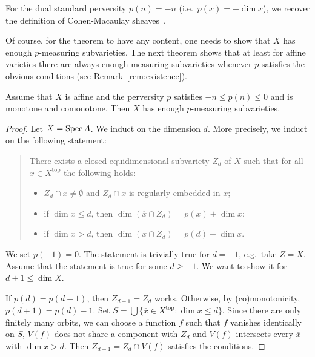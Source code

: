 \documentclass[english,biblatex-alpha,bw]{short-notes}
\begin{document}
\begin{Ex}
    For the dual standard perversity $p(n) = -n$ (i.e.\ $p(x) = -\dim x$), we recover the definition of Cohen-Macaulay sheaves~\cite[Section~IV.3]{Hartshorne:1966:ResiduesAndDuality}.
\end{Ex}

Of course, for the theorem to have any content, one needs to show that $X$ has enough $p$-measuring subvarieties.
The next theorem shows that at least for affine varieties there are always enough measuring subvarieties whenever $p$ satisfies the obvious conditions (see Remark~\ref{rem:existence}).

\begin{Thm}\label{thm:existance}%
    Assume that $X$ is affine and the perversity $p$ satisfies $-n \le p(n) \le 0$ and is monotone and comonotone.
    Then $X$ has enough $p$-measuring subvarieties.
\end{Thm}

\begin{proof}
    Let $X = \operatorname{Spec} A$.
    We induct on the dimension $d$.
    More precisely, we induct on the following statement:
    \begin{quote}
        There exists a closed equidimensional subvariety $Z_d$ of $X$ such that for all $x \in  X^{\mathrm{top}}$ the following holds:
        \begin{itemize}
            \item $Z_d \cap \overline x \ne \emptyset$ and $Z_d \cap \overline x$ is regularly embedded in $\overline x$;
            \item if $\dim x \le d$, then $\dim(\overline x \cap  Z_d) = p(x) + \dim x$;
            \item if $\dim x > d$, then $\dim(\overline x \cap  Z_d) = p(d) + \dim x$.
        \end{itemize}
    \end{quote}
    We set $p(-1) = 0$.
    The statement is trivially true for $d = -1$, e.g.~take $Z = X$.
    Assume that the statement is true for some $d \ge -1$.
    We want to show it for $d+1 \le \dim X$.

    If $p(d) = p(d+1)$, then $Z_{d+1} = Z_{d}$ works.
    Otherwise, by (co)monotonicity, $p(d+1) = p(d) - 1$.
    Set $S = \bigcup \{ \overline x \in  X^{\mathrm{top}} : \dim x \le d\}$.
    Since there are only finitely many orbits, we can choose a function $f$ such that $f$ vanishes identically on $S$, $V(f)$ does not share a component with $Z_d$ and $V(f)$ intersects every $\overline x$ with $\dim x > d$.
    Then $Z_{d+1} = Z_d \cap V(f)$ satisfies the conditions.
\end{proof}
\end{document}

